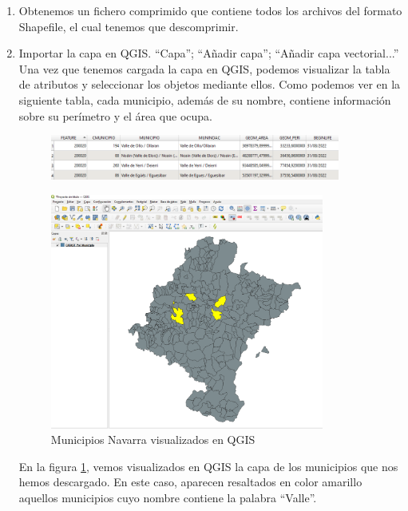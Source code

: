 \begin{itemize}
\begin{enumerate}
        \item Obtenemos un fichero comprimido que contiene todos los archivos del formato Shapefile, el cual tenemos que descomprimir.
        
        \item Importar la capa en QGIS. “Capa”; “Añadir capa”; “Añadir capa vectorial...”\\
        Una vez que tenemos cargada la capa en QGIS, podemos visualizar la tabla de atributos y seleccionar los objetos mediante ellos. 
        Como podemos ver en la siguiente tabla, cada municipio, además de su nombre, contiene información sobre su perímetro y el área que ocupa.   
        \begin{figure}[H]
            \centering
            \includegraphics[width=0.90\textwidth, height=0.10\textheight]{Imagenes/caso-practico/atrubutos-municipios-qgis.png}
        \end{figure}

        \begin{figure}[H]
            \centering
            \includegraphics[width=0.85\textwidth]{Imagenes/caso-practico/municipios-qgis.png}
            \caption{Municipios Navarra visualizados en QGIS} \label{fig:municipios-qgis}
        \end{figure}
        En la figura \ref{fig:municipios-qgis}, vemos visualizados en QGIS la capa de los municipios que nos hemos descargado.
        En este caso, aparecen resaltados en color amarillo aquellos municipios cuyo nombre contiene la palabra “Valle”.
        

\end{enumerate}
\end{itemize}
